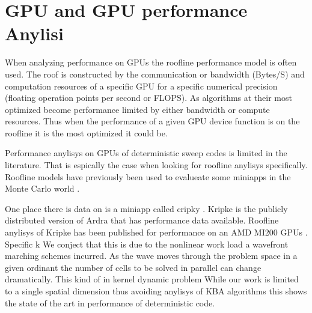 \if
\section{GPU and GPU performance Anylisi}
When analyzing performance on GPUs the roofline performance model is often used.
The roof is constructed by the communication or bandwidth (Bytes/S) and computation resources of a specific GPU for a specific numerical precision (floating operation points per second or FLOPS).
As algorithms at their most optimized become performance limited by either bandwidth or compute resources.
Thus when the performance of a given GPU device function is on the roofline it is the most optimized it could be.

Performance anylisys on GPUs of deterministic sweep codes is limited in the literature. 
That is espically the case when looking for roofline anylisys specifically.
Roofline models have previously been used to evalueate some miniapps in the Monte Carlo world \citep{tramm2021domain, tramm2022roofline}.

One place there is data on is a miniapp called cripky \citep{kunen_kripke_2015}.
Kripke is the publicly distributed version of Ardra that has performance data available.
Roofline anylisys of Kripke has been published for performance on an AMD MI200 GPUs \citep{wolfe2022roofline}. 
Specific k
We conject that this is due to the nonlinear work load a wavefront marching schemes incurred. 
As the wave moves through the problem space in a given ordinant the number of cells to be solved in parallel can change dramatically.
This kind of in kernel dynamic problem 
While our work is limited to a single spatial dimension thus avoiding anylisys of KBA algorithms this shows the state of the art in performance of deterministic code.
\fi